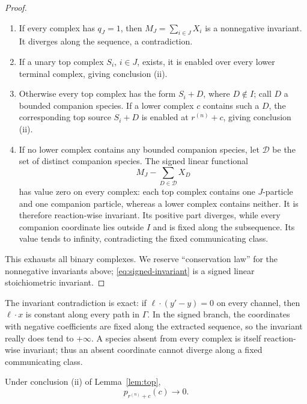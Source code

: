 \begin{proof}
\begin{enumerate}[label=\textup{(\alph*)},leftmargin=2.5em]
\item If every complex has \(q_J=1\), then
      \(M_J=\sum_{i\in J}X_i\) is a nonnegative invariant.  It diverges along
      the sequence, a contradiction.
\item If a unary top complex \(S_i\), \(i\in J\), exists, it is enabled over
      every lower terminal complex, giving conclusion (ii).
\item Otherwise every top complex has the form \(S_i+D\), where
      \(D\notin I\); call \(D\) a bounded companion species.  If a lower complex
      \(c\) contains such a \(D\), the corresponding top source \(S_i+D\)
      is enabled at \(r^{(n)}+c\), giving conclusion (ii).
\item If no lower complex contains any bounded companion species, let
      \(\mathcal D\) be the set of distinct companion species.  The signed
      linear functional
      \begin{equation}\label{eq:signed-invariant}
        M_J-\sum_{D\in\mathcal D}X_D
      \end{equation}
      has value zero on every complex: each top complex contains one
      \(J\)-particle and one companion particle, whereas a lower complex
      contains neither.  It is therefore reaction-wise invariant.  Its
      positive part diverges, while every companion coordinate lies outside
      \(I\) and is fixed along the subsequence.  Its value tends to infinity,
      contradicting the fixed communicating class.
\end{enumerate}

This exhausts all binary complexes.  We reserve ``conservation law'' for the
nonnegative invariants above; \eqref{eq:signed-invariant} is a signed linear
stoichiometric invariant.
\end{proof}

The invariant contradiction is exact: if \(\ell\cdot(y'-y)=0\) on every
channel, then \(\ell\cdot x\) is constant along every path in \(\Gamma\).
In the signed branch, the coordinates with negative coefficients are fixed along
the extracted sequence, so the invariant really does tend to \(+\infty\).
A species absent from every complex is itself reaction-wise invariant; thus an
absent coordinate cannot diverge along a fixed communicating class.

\begin{lemma}\label{lem:terminal}
Under conclusion \textup{(ii)} of Lemma~\ref{lem:top},
\begin{equation}\label{eq:terminal-zero}
  p_{r^{(n)}+c}(c)\longrightarrow0.
\end{equation}
\end{lemma}

